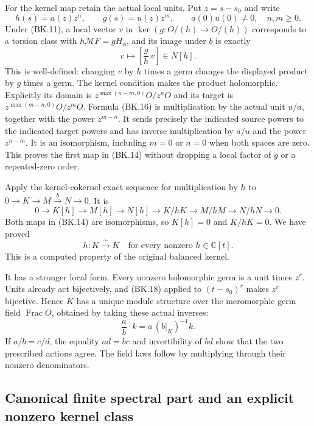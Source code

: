 For the kernel map retain the actual local units.  Put $z=s-s_0$
and write
\[
 h(s)=a(z)z^n,\qquad g(s)=u(z)z^m,
 \qquad a(0)u(0)\ne0,\quad n,m\ge0.             \tag{BK.15}
\]
Under (BK.11), a local vector $v$ in
$\ker(g:O/(h)\to O/(h))$ corresponds to a torsion class with
$h\mathcal MF=gH_\phi$, and its image under $b$ is exactly
\[
 v\longmapsto\left[\frac gh\,v\right]\in N[h]. \tag{BK.16}
\]
This is well-defined: changing $v$ by $h$ times a germ changes
the displayed product by $g$ times a germ.  The kernel condition
makes the product holomorphic.  Explicitly its domain is
$z^{\max(n-m,0)}O/z^nO$ and its target is
$z^{\max(m-n,0)}O/z^mO$.  Formula (BK.16) is multiplication by
the actual unit $u/a$, together with the power $z^{m-n}$.
It sends precisely the indicated source powers to the indicated
target powers and has inverse multiplication by $a/u$ and the
power $z^{n-m}$.  It is an isomorphism, including $m=0$ or $n=0$
when both spaces are zero.  This proves the first map in (BK.14)
without dropping a local factor of $g$ or a repeated-zero order.

Apply the kernel-cokernel exact sequence for multiplication by $h$
to $0\to K\to M\xrightarrow bN\to0$.  It is
\[
 0\to K[h]\to M[h]\to N[h]\to K/hK\to M/hM\to N/hN\to0.
                                                               \tag{BK.17}
\]
Both maps in (BK.14) are isomorphisms, so $K[h]=0$ and $K/hK=0$.
We have proved
\[
 \boxed{\quad h:K\xrightarrow{\sim}K
             \quad\text{for every nonzero }h\in\mathbb C[t].\quad}
                                                               \tag{BK.18}
\]
This is a computed property of the original balanced kernel.

It has a stronger local form.  Every nonzero holomorphic germ
is a unit times $z^r$.  Units already act bijectively, and (BK.18)
applied to $(t-s_0)^r$ makes $z^r$ bijective.  Hence $K$ has a
unique module structure over the meromorphic germ field
$\operatorname{Frac}O$, obtained by taking these actual inverses:
\[
 \frac ab\cdot k=a\,(b|_K)^{-1}k.             \tag{BK.19}
\]
If $a/b=c/d$, the equality $ad=bc$ and invertibility of $bd$
show that the two prescribed actions agree.  The field laws follow
by multiplying through their nonzero denominators.

\subsection{Canonical finite spectral part and an explicit nonzero kernel class}

